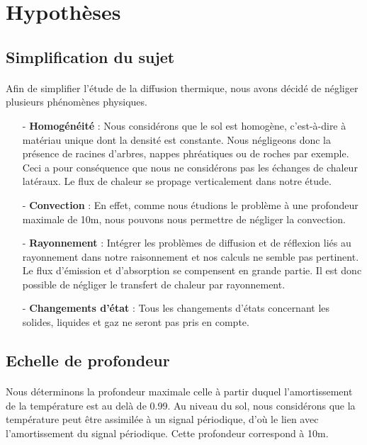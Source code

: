 \documentclass{article}
\begin{document}
\section{Hypothèses}

\subsection{Simplification du sujet}

\paragraph{}
Afin de simplifier l'étude de la diffusion thermique, nous avons décidé de négliger plusieurs phénomènes physiques.

\begin{enumerate}
    \item[-] \textbf{Homogénéité} : Nous considérons que le sol est homogène, c'est-à-dire à matériau unique dont la densité est constante. Nous négligeons donc la présence de racines d'arbres, nappes phréatiques ou de roches par exemple. Ceci a pour conséquence que nous ne considérons pas les échanges de chaleur latéraux. Le flux de chaleur se propage verticalement dans notre étude.
    
    \item[-] \textbf{Convection} : En effet, comme nous étudions le problème à une profondeur maximale de 10m, nous pouvons nous permettre de négliger la convection.
    
    \item[-] \textbf{Rayonnement} : Intégrer les problèmes de diffusion et de réflexion liés au rayonnement dans notre raisonnement et nos calculs ne semble pas pertinent. Le flux d'émission et d'absorption se compensent en grande partie. Il est donc possible de négliger le transfert de chaleur par rayonnement.
    
    \item[-]\textbf{Changements d'état} : Tous les changements d'états concernant les solides, liquides et gaz ne seront pas pris en compte.
    
\end{enumerate}

\subsection{Echelle de profondeur}

\paragraph{}
Nous déterminons la profondeur maximale celle à partir duquel l'amortissement de la température est au delà de 0.99. Au niveau du sol, nous considérons que la température peut être assimilée à un signal périodique, d'où le lien avec l'amortissement du signal périodique. Cette profondeur correspond à 10m.
\end{document}
